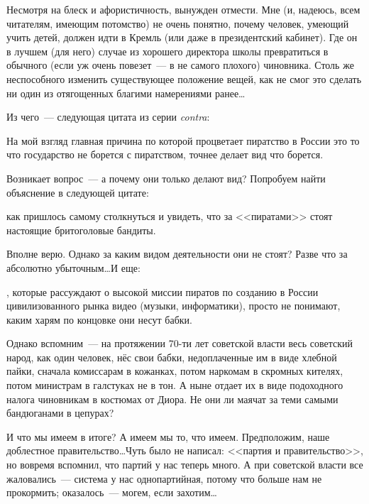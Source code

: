 Несмотря на блеск и афористичность, вынужден отмести. Мне (и, надеюсь, всем читателям, имеющим потомство) не очень понятно, почему человек, умеющий учить детей, должен идти в Кремль (или даже в президентский кабинет). Где он в лучшем (для него) случае из хорошего директора школы превратиться в обычного (если уж очень повезет~--- в не самого плохого) чиновника. Столь же неспособного изменить существующее положение вещей, как не смог это сделать ни один из отягощенных благими намерениями ранее\dots

Из чего~--- следующая цитата из серии \textit{contra}:
\begin{shadequote}{}
На мой взгляд главная причина по которой процветает пиратство в России это то что государство не борется с пиратством, точнее делает вид что борется.
\end{shadequote}

Возникает вопрос~--- а почему они только делают вид? Попробуем найти объяснение в следующей цитате:
\begin{shadequote}{}
 как пришлось самому столкнуться и увидеть, что за <<пиратами>> стоят настоящие бритоголовые бандиты.
\end{shadequote}
Вполне верю. Однако за каким видом деятельности они не стоят? Разве что за абсолютно убыточным\dots И еще:
\begin{shadequote}{}
, которые рассуждают о высокой миссии пиратов по созданию в России цивилизованного рынка видео (музыки, информатики), просто не понимают, каким харям по концовке они несут бабки.
\end{shadequote}

Однако вспомним~--- на протяжении 70-ти лет советской власти весь советский народ, как один человек, нёс свои бабки, недоплаченные им в виде хлебной пайки, сначала комиссарам в кожанках, потом наркомам в скромных кителях, потом министрам в галстуках не в тон. А ныне отдает их в виде подоходного налога чиновникам в костюмах от Диора. Не они ли маячат за теми самыми бандюганами в цепурах?

И что мы имеем в итоге? А имеем мы то, что имеем. Предположим, наше доблестное правительство\dots Чуть было не написал: <<партия и правительство>>, но вовремя вспомнил, что партий у нас теперь много. А при советской власти все жаловались~--- система у нас однопартийная, потому что больше нам не прокормить; оказалось~--- могем, если захотим\dots

